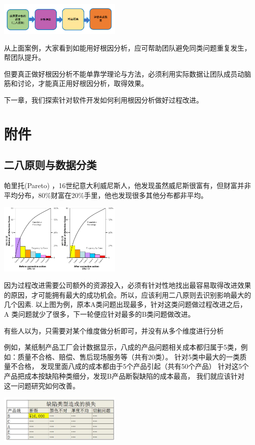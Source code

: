 
\includegraphics[width=6cm]{微信截图_20230707090950.png}

从上面案例，大家看到如能用好根因分析，应可帮助团队避免同类问题重复发生，帮团队提升。

但要真正做好根因分析不能单靠学理论与方法，必须利用实际数据让团队成员动脑筋和讨论，才能真正用好根因分析，取得效果。

下一章，我们探索针对软件开发如何利用根因分析做好过程改进。

\hypertarget{ux9644ux4ef6}{%
\section{附件}\label{ux9644ux4ef6}}

\hypertarget{ux4e8cux516bux539fux5219ux4e0eux6570ux636eux5206ux7c7b}{%
\subsection{二八原则与数据分类}\label{ux4e8cux516bux539fux5219ux4e0eux6570ux636eux5206ux7c7b}}

帕里托(Pareto)
，16世纪意大利威尼斯人，他发现虽然威尼斯很富有，但财富并非平均分布，80\%财富在20\%手里，他也发现很多其他分布都非平均。


\includegraphics[width=6cm]{ToolsParetoScreenshot_2023-06-02_191628.jpg}

因为过程改进需要公司额外的资源投入，必须有针对性地找出最容易取得改进效果的原因，才可能拥有最大的成功机会。所以，应该利用二八原则去识别影响最大的几个因素.
以上图为例，原本A类问题出现最多，针对这类问题做过程改进之后， A
类问题就少了很多，下一轮便应针对最多的B类问题做改进。

有些人以为，只需要对某个维度做分析即可，并没有从多个维度进行分析

例如，某纸制产品工厂会计数据显示，八成的产品问题相关成本都归属于5类，例如：质量不合格、赔偿、售后现场服务等（共有20类）。
针对5类中最大的一类质量不合格，
发现里面八成的成本都由于5个产品引起（共有50个产品）
针对这5个产品把成本按缺陷种类细分，发现B产品断裂缺陷的成本最高，
我们就应该针对这一问题研究如何改善。


\includegraphics[width=6cm]{Ar2_缺陷类型造成的损失.jpg}



